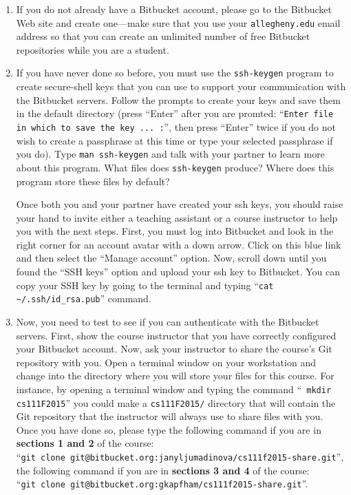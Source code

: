 \begin{enumerate}

  \item If you do not already have a Bitbucket account, please go to the Bitbucket Web site and create one---make sure
    that you use your {\tt allegheny.edu} email address so that you can create an unlimited number of free Bitbucket
    repositories while you are a student. 
    
  \item If you have never done so before, you must use the {\tt ssh-keygen} program to create secure-shell keys that you
    can use to support your communication with the Bitbucket servers. Follow the prompts to create your keys and save
    them in the default directory (press ``Enter'' after you are promted: ``{\tt Enter file in which to save the key ...
    :}'', then press ``Enter'' twice if you do not wish to create a passphrase at this time or type your selected
    passphrase if you do).   Type {\tt man ssh-keygen} and talk with your partner to learn more about this program.
    What files does {\tt ssh-keygen} produce?  Where does this program store these files by default?

    Once both you and your partner have created your ssh keys, you should raise your hand to invite either a teaching
    assistant or a course instructor to help you with the next steps. First, you must log into Bitbucket and look in the
    right corner for an account avatar with a down arrow.  Click on this blue link and then select the ``Manage
    account'' option. Now, scroll down until you found the ``SSH keys'' option and upload your ssh key to Bitbucket. You
    can copy your SSH key by going to the terminal and typing ``{\tt cat \textasciitilde{}/.ssh/id\_rsa.pub}'' command.

  \item Now, you need to test to see if you can authenticate with the Bitbucket servers.  First, show the course
    instructor that you have correctly configured your Bitbucket account.  Now, ask your instructor to share the
    course's Git repository with you.  Open a terminal window on your workstation and change into the directory where
    you will store your files for this course.  For instance, by opening a terminal window and typing the command ``{\tt
    mkdir cs111F2015}'' you could make a {\tt cs111F2015/} directory that will contain the Git repository that the
    instructor will always use to share files with you.  Once you have done so, please type the following command if you
    are in {\bf sections 1 and 2} of the course: \\ ``{\tt git clone
    git@bitbucket.org:janyljumadinova/cs111f2015-share.git}'',  the following command if you are in {\bf
    sections 3 and 4} of the course: \\``{\tt git clone git@bitbucket.org:gkapfham/cs111f2015-share.git}''.  


\end{enumerate}
